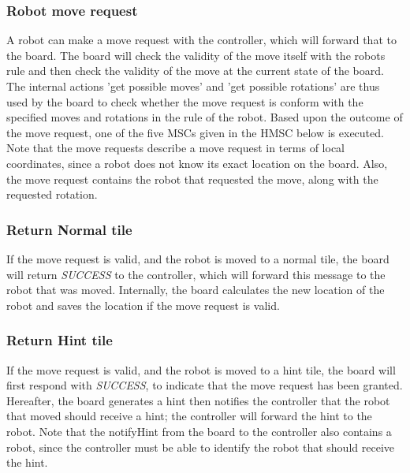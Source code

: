 	\subsubsection{Robot move request}
	\begin{minipage}{\linewidth}
		A robot can make a move request with the controller, which will forward that to the board. The board will check the validity of the move itself with the robots rule and then check the validity of the move at the current state of the board. The internal actions 'get possible moves' and 'get possible rotations' are thus used by the board to check whether the move request is conform with the specified moves and rotations in the rule of the robot. Based upon the outcome of the move request, one of the five MSCs given in the HMSC below is executed. \\
		Note that the move requests describe a move request in terms of local coordinates, since a robot does not know its exact location on the board. Also, the move request contains the robot that requested the move, along with the requested rotation.

		
    \end{minipage}

	\subsubsection{Return Normal tile}
	\begin{minipage}{\linewidth}
		If the move request is valid, and the robot is moved to a normal tile, the board will return \emph{SUCCESS} to the controller, which will forward this message to the robot that was moved. Internally, the board calculates the new location of the robot and saves the location if the move request is valid.

		
	\end{minipage}

	\subsubsection{Return Hint tile}
	\begin{minipage}{\linewidth}
		If the move request is valid, and the robot is moved to a hint tile, the board will first respond with \emph{SUCCESS}, to indicate that the move request has been granted. Hereafter, the board generates a hint then notifies the controller that the robot that moved should receive a hint; the controller will forward the hint to the robot. Note that the notifyHint from the board to the controller also contains a robot, since the controller must be able to identify the robot that should receive the hint.

		
	\end{minipage}

